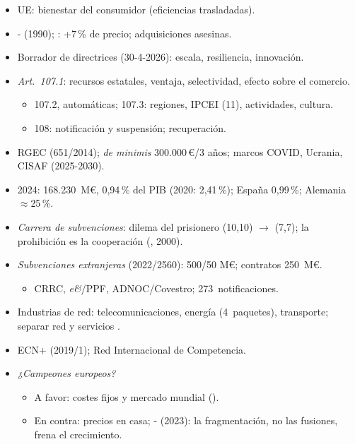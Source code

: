 \documentclass{article}
\begin{document}
\begin{columnas}
\begin{itemize}
\begin{itemize}
  \end{itemize}
\item UE: bienestar del consumidor (eficiencias trasladadas).
\item {}- (1990); : +7\,\% de precio; adquisiciones asesinas.
\item Borrador de directrices (30-4-2026): escala, resiliencia, innovación.
\end{itemize}
\begin{itemize}
\item \emph{Art.~107.1}: recursos estatales, ventaja, selectividad, efecto sobre el comercio.
  \begin{itemize}
  \item 107.2, automáticas; 107.3: regiones, IPCEI (11), actividades, cultura.
  \item 108: notificación y suspensión; recuperación.
  \end{itemize}
\item RGEC (651/2014); \emph{de minimis} 300.000\,€/3 años; marcos COVID, Ucrania, CISAF (2025-2030).
\item 2024: 168.230~M€, 0,94\,\% del PIB (2020: 2,41\,\%); España 0,99\,\%; Alemania $\approx$25\,\%.
\item \emph{Carrera de subvenciones}: dilema del prisionero (10,10) $\to$ (7,7); la prohibición es la cooperación (, 2000).
\item \emph{Subvenciones extranjeras} (2022/2560): 500/50 M€; contratos 250~M€.
  \begin{itemize}
  \item CRRC, \emph{e\&}/PPF, ADNOC/Covestro; 273~notificaciones.
  \end{itemize}
\end{itemize}

\begin{itemize}
\item Industrias de red: telecomunicaciones, energía (4~paquetes), transporte; separar red y servicios .
\item ECN+ (2019/1); Red Internacional de Competencia.
\item \emph{¿Campeones europeos?}
  \begin{itemize}
  \item A favor: costes fijos y mercado mundial ().
  \item En contra: precios en casa; - (2023): la fragmentación, no las fusiones, frena el crecimiento.
  \end{itemize}
\end{itemize}


\end{columnas}
\end{document}
